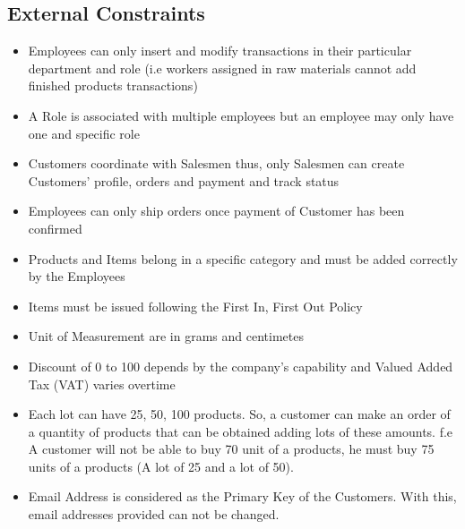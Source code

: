\subsection{External Constraints}
\begin{itemize}
\item Employees can only insert and modify transactions in their particular department and role (i.e workers assigned in raw materials cannot add finished products transactions)
\item A Role is associated with multiple employees but an employee may only have one and specific role
\item Customers coordinate with Salesmen thus, only Salesmen can create Customers' profile, orders and payment and track status
\item Employees can only ship orders once payment of Customer has been confirmed
\item Products and Items belong in a specific category and must be added correctly by the Employees
\item Items must be issued following the First In, First Out Policy
\item Unit of Measurement are in grams and centimetes
\item Discount of 0 to 100 depends by the company's capability and Valued Added Tax (VAT) varies overtime
\item Each lot can have 25, 50, 100 products. So, a customer can make an order of a quantity of products that can be obtained adding lots of these amounts. f.e A customer will not be able to buy 70 unit of a products, he must buy 75 units of a products (A lot of 25 and a lot of 50).
\item Email Address is considered as the Primary Key of the Customers. With this, email addresses provided can not be changed.
\end{itemize}